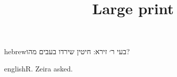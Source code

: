 \documentclass{article}
\title{Large print}\author{}\date{}
\begin{document}
\maketitle
\begin{mekor}
\begin{mekorlang}{hebrew}{}בעי ר׳ זירא: חיטין שירדו בעבים מהו?\end{mekorlang}
\begin{mekorlang}{english}{}R. Zeira asked.\end{mekorlang}
\end{mekor}
\end{document}
